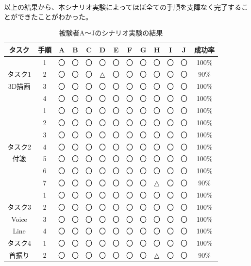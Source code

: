 \documentclass[11pt,a4j, titlepage]{jarticle} %
\begin{document}
以上の結果から、本シナリオ実験によってほぼ全ての手順を支障なく完了することができたことがわかった。

\begin{table}[H]
  \caption{被験者A～Jのシナリオ実験の結果}
  \label{table:jikken_kekka}
  \begin{center}
  \begin{tabular}{|c||c|c|c|c|c|c|c|c|c|c|c||c|} \hline
    タスク & 手順 & A & B & C & D & E & F & G & H & I & J & 成功率 \\ \hline \hline
             & 1 & 〇 & 〇 & 〇 & 〇 & 〇 & 〇 & 〇 & 〇 & 〇 & 〇 & 100\% \\ \cline{2-13}
    タスク1 & 2 & 〇 & 〇 & 〇 & △ & 〇 & 〇 & 〇 & 〇 & 〇 & 〇 &  90\% \\ \cline{2-13}
   3D描画& 3 & 〇 & 〇 & 〇 & 〇 & 〇 & 〇 & 〇 & 〇 & 〇 & 〇 & 100\% \\ \cline{2-13}
             & 4 & 〇 & 〇 & 〇 & 〇 & 〇 & 〇 & 〇 & 〇 & 〇 & 〇 & 100\% \\ \cline{2-13} \hline \hline
             & 1 & 〇 & 〇 & 〇 & 〇 & 〇 & 〇 & 〇 & 〇 & 〇 & 〇 & 100\% \\ \cline{2-13}
             & 2 & 〇 & 〇 & 〇 & 〇 & 〇 & 〇 & 〇 & 〇 & 〇 & 〇 & 100\% \\ \cline{2-13}
             & 3 & 〇 & 〇 & 〇 & 〇 & 〇 & 〇 & 〇 & 〇 & 〇 & 〇 & 100\% \\ \cline{2-13}
    タスク2 & 4 & 〇 & 〇 & 〇 & 〇 & 〇 & 〇 & 〇 & 〇 & 〇 & 〇 & 100\% \\ \cline{2-13}
    付箋   & 5 & 〇 & 〇 & 〇 & 〇 & 〇 & 〇 & 〇 & 〇 & 〇 & 〇 & 100\% \\ \cline{2-13}
             & 6 & 〇 & 〇 & 〇 & 〇 & 〇 & 〇 & 〇 & 〇 & 〇 & 〇 & 100\% \\ \cline{2-13}
             & 7 & 〇 & 〇 & 〇 & 〇 & 〇 & 〇 & 〇 & △ & 〇 & 〇 & 90\% \\ \cline{2-13} \hline \hline
             & 1 & 〇 & 〇 & 〇 & 〇 & 〇 & 〇 & 〇 & 〇 & 〇 & 〇 & 100\% \\ \cline{2-13}
    タスク3 & 2 & 〇 & 〇 & 〇 & 〇 & 〇 & 〇 & 〇 & 〇 & 〇 & 〇 & 100\% \\ \cline{2-13}
    Voice  & 3 & 〇 & 〇 & 〇 & 〇 & 〇 & 〇 & 〇 & 〇 & 〇 & 〇 & 100\% \\ \cline{2-13}
    Line    & 4 & 〇 & 〇 & 〇 & 〇 & 〇 & 〇 & 〇 & 〇 & 〇 & 〇 & 100\% \\ \cline{2-13} \hline \hline
    タスク4 & 1 & 〇 & 〇 & 〇 & 〇 & 〇 & 〇 & 〇 & 〇 & 〇 & 〇 & 100\% \\ \cline{2-13}
    首振り & 2 & 〇 & 〇 & 〇 & 〇 & 〇 & 〇 & 〇 & △ & 〇 & 〇 & 90\% \\ \cline{2-13} \hline
  \end{tabular}
  \end{center}
\end{table}
\end{document}
